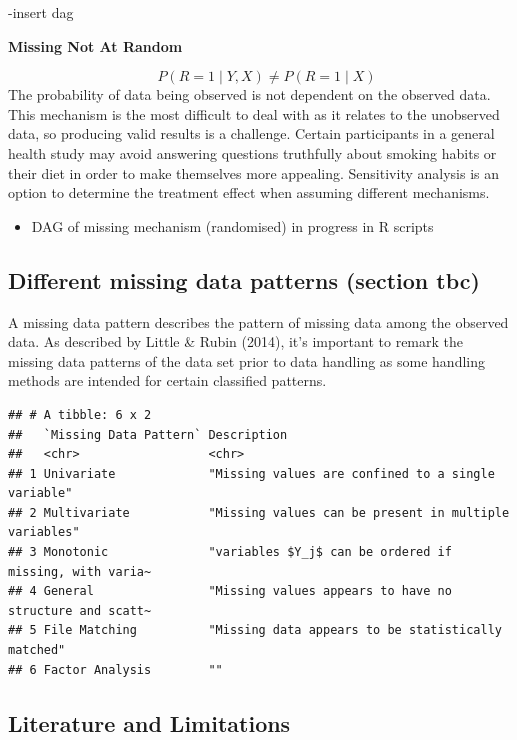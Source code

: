 \documentclass{article}
\providecommand{\tightlist}{%
  \setlength{\itemsep}{0pt}\setlength{\parskip}{0pt}}
\begin{document}
-insert dag

\textbf{Missing Not At Random}

\[\quad P(R = 1 \mid Y, X) \ne P(R = 1 \mid X)\] The probability of data
being observed is not dependent on the observed data. This mechanism is
the most difficult to deal with as it relates to the unobserved data, so
producing valid results is a challenge. Certain participants in a
general health study may avoid answering questions truthfully about
smoking habits or their diet in order to make themselves more appealing.
Sensitivity analysis is an option to determine the treatment effect when
assuming different mechanisms.

\begin{itemize}
\tightlist
\item
  DAG of missing mechanism (randomised) in progress in R scripts
\end{itemize}

\subsection{Different missing data patterns (section
tbc)}\label{different-missing-data-patterns-section-tbc}

A missing data pattern describes the pattern of missing data among the
observed data. As described by Little \& Rubin (2014), it's important to
remark the missing data patterns of the data set prior to data handling
as some handling methods are intended for certain classified patterns.

\begin{verbatim}
## # A tibble: 6 x 2
##   `Missing Data Pattern` Description                                            
##   <chr>                  <chr>                                                  
## 1 Univariate             "Missing values are confined to a single variable"     
## 2 Multivariate           "Missing values can be present in multiple variables"  
## 3 Monotonic              "variables $Y_j$ can be ordered if missing, with varia~
## 4 General                "Missing values appears to have no structure and scatt~
## 5 File Matching          "Missing data appears to be statistically matched"     
## 6 Factor Analysis        ""
\end{verbatim}

\subsection{Literature and
Limitations}\label{literature-and-limitations}
\end{document}
